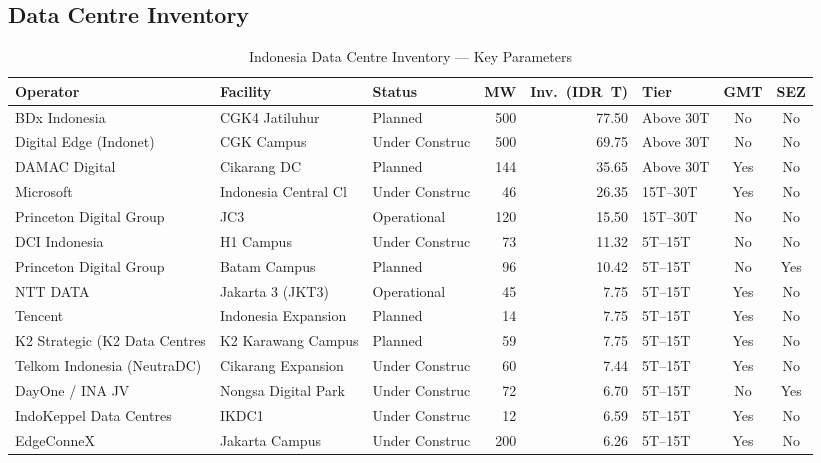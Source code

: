 \documentclass[11pt,english]{article}
\begin{document}
\newpage
\begin{appendices}

\section{Data Centre Inventory}
\label{app:inventory}

\begin{table}[H]
\centering
\caption{Indonesia Data Centre Inventory --- Key Parameters}
\begin{threeparttable}
\scriptsize
\begin{tabular}{l l l r r l c c}
\toprule
\textbf{Operator} & \textbf{Facility} & \textbf{Status} & \textbf{MW} & \textbf{Inv.\ (IDR~T)} & \textbf{Tier} & \textbf{GMT} & \textbf{SEZ} \\
\midrule
  BDx Indonesia & CGK4 Jatiluhur & Planned & 500 & 77.50 & Above 30T & No & No \\
  Digital Edge (Indonet) & CGK Campus & Under Construc & 500 & 69.75 & Above 30T & No & No \\
  DAMAC Digital & Cikarang DC & Planned & 144 & 35.65 & Above 30T & Yes & No \\
  Microsoft & Indonesia Central Cl & Under Construc & 46 & 26.35 & 15T--30T & Yes & No \\
  Princeton Digital Group & JC3 & Operational & 120 & 15.50 & 15T--30T & No & No \\
  DCI Indonesia & H1 Campus & Under Construc & 73 & 11.32 & 5T--15T & No & No \\
  Princeton Digital Group & Batam Campus & Planned & 96 & 10.42 & 5T--15T & No & Yes \\
  NTT DATA & Jakarta 3 (JKT3) & Operational & 45 & 7.75 & 5T--15T & Yes & No \\
  Tencent & Indonesia Expansion & Planned & 14 & 7.75 & 5T--15T & Yes & No \\
  K2 Strategic (K2 Data Centres  & K2 Karawang Campus & Planned & 59 & 7.75 & 5T--15T & Yes & No \\
  Telkom Indonesia (NeutraDC) & Cikarang Expansion & Under Construc & 60 & 7.44 & 5T--15T & Yes & No \\
  DayOne / INA JV & Nongsa Digital Park & Under Construc & 72 & 6.70 & 5T--15T & No & Yes \\
  IndoKeppel Data Centres & IKDC1 & Under Construc & 12 & 6.59 & 5T--15T & Yes & No \\
  EdgeConneX & Jakarta Campus & Under Construc & 200 & 6.26 & 5T--15T & Yes & No \\

\end{tabular}
\end{threeparttable}
\end{table}
\end{appendices}
\end{document}
